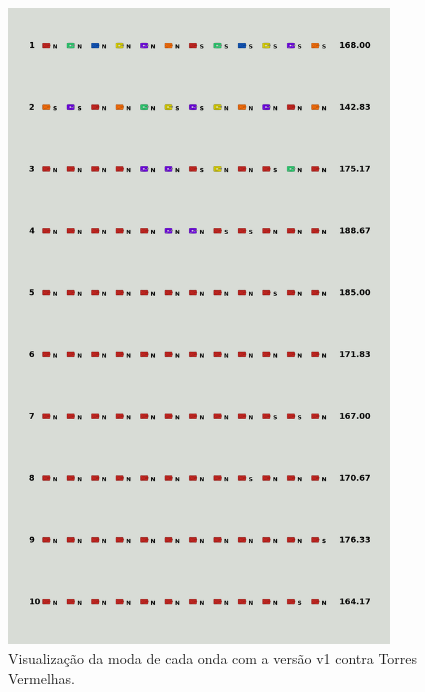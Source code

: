 \begin{figure}[H]
  \centering
  \includegraphics[width=0.9\textwidth]{figuras/td/td_allred_ai_mode_1_1.png}
  \caption{Visualização da moda de cada onda com a versão v1 contra Torres Vermelhas.}
  \label{fig:td-moda-red-1-1}
\end{figure}

